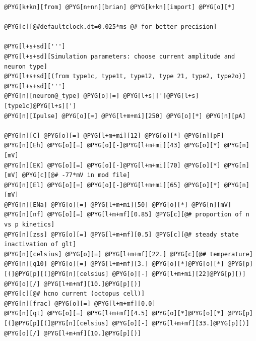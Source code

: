 \documentclass[letterpaper,10pt,english]{manual}
\begin{document}
\begin{Verbatim}[commandchars=@\[\]]
@PYG[k+kn][from] @PYG[n+nn][brian] @PYG[k+kn][import] @PYG[o][*]

@PYG[c][@#defaultclock.dt=0.025*ms @# for better precision]

@PYG[l+s+sd][''']
@PYG[l+s+sd][Simulation parameters: choose current amplitude and neuron type]
@PYG[l+s+sd][(from type1c, type1t, type12, type 21, type2, type2o)]
@PYG[l+s+sd][''']
@PYG[n][neuron@_type] @PYG[o][=] @PYG[l+s][']@PYG[l+s][type1c]@PYG[l+s][']
@PYG[n][Ipulse] @PYG[o][=] @PYG[l+m+mi][250] @PYG[o][*] @PYG[n][pA]

@PYG[n][C] @PYG[o][=] @PYG[l+m+mi][12] @PYG[o][*] @PYG[n][pF]
@PYG[n][Eh] @PYG[o][=] @PYG[o][-]@PYG[l+m+mi][43] @PYG[o][*] @PYG[n][mV]
@PYG[n][EK] @PYG[o][=] @PYG[o][-]@PYG[l+m+mi][70] @PYG[o][*] @PYG[n][mV] @PYG[c][@# -77*mV in mod file]
@PYG[n][El] @PYG[o][=] @PYG[o][-]@PYG[l+m+mi][65] @PYG[o][*] @PYG[n][mV]
@PYG[n][ENa] @PYG[o][=] @PYG[l+m+mi][50] @PYG[o][*] @PYG[n][mV]
@PYG[n][nf] @PYG[o][=] @PYG[l+m+mf][0.85] @PYG[c][@# proportion of n vs p kinetics]
@PYG[n][zss] @PYG[o][=] @PYG[l+m+mf][0.5] @PYG[c][@# steady state inactivation of glt]
@PYG[n][celsius] @PYG[o][=] @PYG[l+m+mf][22.] @PYG[c][@# temperature]
@PYG[n][q10] @PYG[o][=] @PYG[l+m+mf][3.] @PYG[o][*]@PYG[o][*] @PYG[p][(]@PYG[p][(]@PYG[n][celsius] @PYG[o][-] @PYG[l+m+mi][22]@PYG[p][)] @PYG[o][/] @PYG[l+m+mf][10.]@PYG[p][)]
@PYG[c][@# hcno current (octopus cell)]
@PYG[n][frac] @PYG[o][=] @PYG[l+m+mf][0.0]
@PYG[n][qt] @PYG[o][=] @PYG[l+m+mf][4.5] @PYG[o][*]@PYG[o][*] @PYG[p][(]@PYG[p][(]@PYG[n][celsius] @PYG[o][-] @PYG[l+m+mf][33.]@PYG[p][)] @PYG[o][/] @PYG[l+m+mf][10.]@PYG[p][)]


\end{Verbatim}
\end{document}
